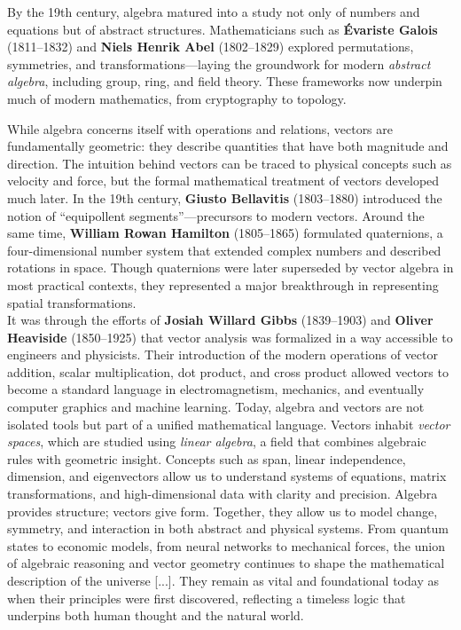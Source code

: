 \documentclass{book}
\begin{document}
By the 19th century, algebra matured into a study not only of numbers and equations but of abstract structures. Mathematicians such as \textbf{Évariste Galois} (1811--1832) and \textbf{Niels Henrik Abel} (1802--1829) explored permutations, symmetries, and transformations---laying the groundwork for modern \emph{abstract algebra}, including group, ring, and field theory. These frameworks now underpin much of modern mathematics, from cryptography to topology.

While algebra concerns itself with operations and relations, vectors are fundamentally geometric: they describe quantities that have both magnitude and direction. The intuition behind vectors can be traced to physical concepts such as velocity and force, but the formal mathematical treatment of vectors developed much later. In the 19th century, \textbf{Giusto Bellavitis} (1803--1880) introduced the notion of ``equipollent segments''---precursors to modern vectors. Around the same time, \textbf{William Rowan Hamilton} (1805--1865) formulated quaternions, a four-dimensional number system that extended complex numbers and described rotations in space. Though quaternions were later superseded by vector algebra in most practical contexts, they represented a major breakthrough in representing spatial transformations.\\

It was through the efforts of \textbf{Josiah Willard Gibbs} (1839--1903) and \textbf{Oliver Heaviside} (1850--1925) that vector analysis was formalized in a way accessible to engineers and physicists. Their introduction of the modern operations of vector addition, scalar multiplication, dot product, and cross product allowed vectors to become a standard language in electromagnetism, mechanics, and eventually computer graphics and machine learning. Today, algebra and vectors are not isolated tools but part of a unified mathematical language. Vectors inhabit \emph{vector spaces}, which are studied using \emph{linear algebra}, a field that combines algebraic rules with geometric insight. Concepts such as span, linear independence, dimension, and eigenvectors allow us to understand systems of equations, matrix transformations, and high-dimensional data with clarity and precision.
Algebra provides structure; vectors give form. Together, they allow us to model change, symmetry, and interaction in both abstract and physical systems. From quantum states to economic models, from neural networks to mechanical forces, the union of algebraic reasoning and vector geometry continues to shape the mathematical description of the universe [...]. They remain as vital and foundational today as when their principles were first discovered, reflecting a timeless logic that underpins both human thought and the natural world.
\end{document}
